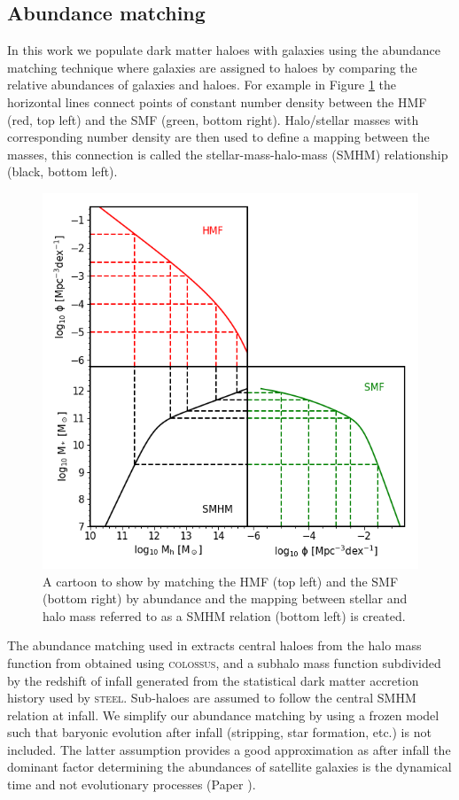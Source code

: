\subsection{Abundance matching}
\label{C2:SubSec:AbnMtch}
In this work we populate dark matter haloes with galaxies using the abundance matching technique where galaxies are assigned to haloes by comparing the relative abundances of galaxies and haloes. For example in Figure \ref{fig:Abn_Toon} the horizontal lines connect points of constant number density between the HMF (red, top left) and the SMF (green, bottom right). Halo/stellar masses with corresponding number density are then used to define a mapping between the masses, this connection is called the stellar-mass-halo-mass (SMHM) relationship (black, bottom left).

\begin{figure}[h]
    \centering
    \includegraphics[width = \linewidth]{Figures/Chapter2/AbundaceMatching.png}
    \caption{A cartoon to show by matching the HMF (top left) and the SMF (bottom right) by abundance and the mapping between stellar and halo mass referred to as a SMHM relation (bottom left) is created.}
    \label{fig:Abn_Toon}
\end{figure}

The abundance matching used in \steel extracts central haloes from the halo mass function from \citet{Despali2016TheDefinitions} obtained using \textsc{colossus}\cite{Diemer2017COLOSSUS:Halos}, and a subhalo mass function subdivided by the redshift of infall generated from the statistical dark matter accretion history used by \textsc{steel}. Sub-haloes are assumed to follow the central SMHM relation at infall. We simplify our abundance matching by using a frozen model such that baryonic evolution after infall (stripping, star formation, etc.) is not included. The latter assumption provides a good approximation as after infall the dominant factor determining the abundances of satellite galaxies is the dynamical time and not evolutionary processes (Paper ).

